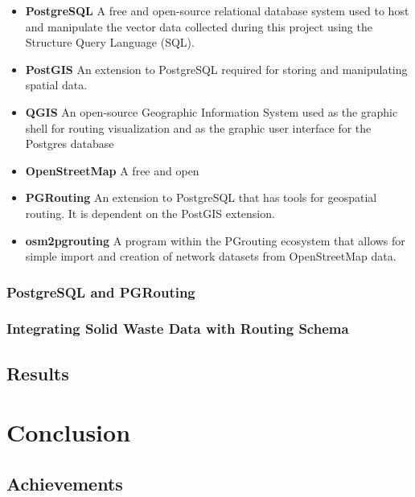 \documentclass[a4paper,12pt,twoside]{article}
\begin{document}
    \begin{itemize}
        \item \textbf{PostgreSQL}
        A free and open-source relational database system used to host and manipulate the vector data collected during this project using the Structure Query Language (SQL).
        \item \textbf{PostGIS}
        An extension to PostgreSQL required for storing and manipulating spatial data.  
        \item \textbf{QGIS}
        An open-source Geographic Information System used as the graphic shell for routing visualization and as the graphic user interface for the Postgres database
        \item \textbf{OpenStreetMap}
        A free and open
        \item \textbf{PGRouting}
        An extension to PostgreSQL that has tools for geospatial routing. It is dependent on the PostGIS extension.
        \item \textbf{osm2pgrouting}
        A program within the PGrouting ecosystem that allows for simple import and creation of network datasets from OpenStreetMap data.
        
    \end{itemize}

\subsubsection{PostgreSQL and PGRouting}

\subsubsection{Integrating Solid Waste Data with Routing Schema}

\subsection{Results}

\section{Conclusion}

    \begin{multicols}{2}
    \lipsum[0-5]
    \end{multicols}

\subsection{Achievements}
\end{document}

